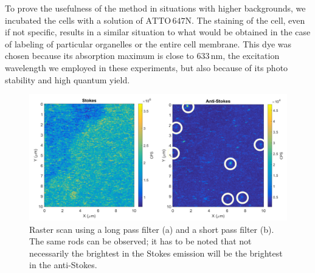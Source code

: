 \documentclass[journal=nalefd,manuscript=letter]{achemso}
\newcommand{\nm}{\ensuremath{\,\textrm{nm}}}
\newcommand{\CPS}{\ensuremath{\,\textrm{cps}}}
\newcommand{\atto}{\ensuremath{\textrm{ATTO}\,647\textrm{N}}}
\begin{document}
% 

To prove the usefulness of the method in situations with higher
backgrounds, we incubated the cells with a solution of \atto.
The staining of the cell, even if not specific, results in a similar situation
to what would be obtained in the case of labeling of particular organelles or
the entire cell membrane. This dye was chosen because its absorption maximum is
close to $633\nm$, the excitation wavelength we employed in these
experiments, but also because of its photo stability and high quantum yield.

\begin{figure}[htp]
\centering
	\includegraphics[width=\textwidth]{Figures/04_Stokes_AS_with_dye/compose_AS_S.PNG}
	\caption{Raster scan using a long pass filter (a) and a short pass filter (b).
	The same rods can be observed; it has to be noted that not necessarily the
	brightest in the Stokes emission will be the brightest in the anti-Stokes.}
	\label{fig:Stokes_AS_with_dye}
\end{figure}
\end{document}
